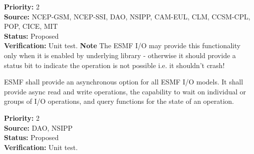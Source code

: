 \begin{reqlist}
{\bf Priority:} 2 \\
{\bf Source:} NCEP-GSM, NCEP-SSI, DAO, NSIPP, CAM-EUL, CLM, CCSM-CPL, POP, CICE, MIT \\
{\bf Status:} Proposed \\
{\bf Verification:} Unit test.
{\bf Note} The ESMF I/O may provide this functionality only when it is 
enabled by underlying library - otherwise it should provide a status
bit to indicate the operation is not possible i.e. it shouldn't crash!
\end{reqlist}


ESMF shall provide an asynchronous option for all ESMF I/O models.
It shall provide async read and write operations, 
the capability to wait on individual or groups of I/O operations,
and query functions for the state of an operation.

\begin{reqlist}
{\bf Priority:} 2 \\
{\bf Source:} DAO, NSIPP\\
{\bf Status:} Proposed \\
{\bf Verification:} Unit test.
\end{reqlist}


